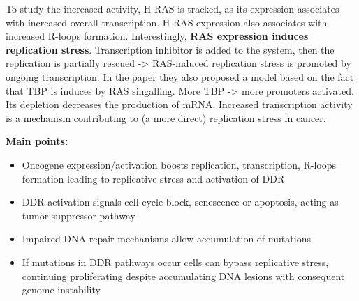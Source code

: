 To study the increased activity, H-RAS is tracked, as its expression
associates with increased overall transcription. H-RAS expression also
associates with increased R-loops formation. Interestingly, \textbf{RAS
expression induces replication stress}.
Transcription inhibitor is added to the system, then the replication is
partially rescued -\textgreater{} RAS-induced replication stress is
promoted by ongoing transcription. In the paper they also proposed a
model based on the fact that TBP is induces by RAS singalling. More TBP
-\textgreater{} more promoters activated. Its depletion decreases the
production of mRNA. Increased transcription activity is a mechanism
contributing to (a more direct) replication stress in cancer.


\textbf{Main points:} 
\begin{itemize}
\item Oncogene expression/activation boosts
replication, transcription, R-loops formation leading to replicative
stress and activation of DDR 
\item DDR activation signals cell cycle block,
senescence or apoptosis, acting as tumor suppressor pathway
\item Impaired
DNA repair mechanisms allow accumulation of mutations
\item If mutations in
DDR pathways occur cells can bypass replicative stress, continuing
proliferating despite accumulating DNA lesions with consequent genome
instability
\end{itemize}


